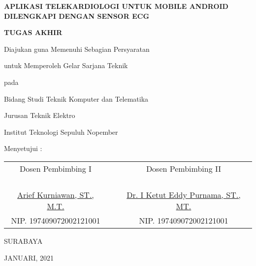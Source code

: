 \begin{center}
\textbf{APLIKASI TELEKARDIOLOGI UNTUK MOBILE ANDROID DILENGKAPI DENGAN SENSOR ECG}

\vspace{10ex}

\textbf{TUGAS AKHIR}

\vspace{7ex}

Diajukan guna Memenuhi Sebagian Persyaratan 

untuk Memperoleh Gelar Sarjana Teknik 

pada 

Bidang Studi Teknik Komputer dan Telematika 

Jurusan Teknik Elektro 

Institut Teknologi Sepuluh Nopember 

\vspace{5ex}

Menyetujui :

\vspace{5ex}

\begin{tabular}{c c c}
Dosen Pembimbing I&\hspace{1ex}&Dosen Pembimbing II
\\
\\
\\
\\
\\
\underline{Arief Kurniawan, ST., M.T.}&\hspace{1ex}&\underline{Dr. I Ketut Eddy Purnama, ST., MT.}
\\
NIP. 197409072002121001&\hspace{1ex}&NIP. 197409072002121001
\end{tabular}

\vspace{23ex}

SURABAYA

JANUARI, 2021

\end{center}